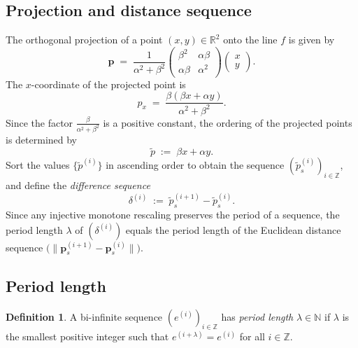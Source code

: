 \documentclass[11pt]{article}
\theoremstyle{plain}
\theoremstyle{definition}
\newtheorem{definition}[theorem]{Definition}
\theoremstyle{remark}
\begin{document}
\subsection{Projection and distance sequence}\label{subsec:projection}

The orthogonal projection of a point $(x, y) \in \mathbb{R}^2$ onto the line
$f$ is given by
\begin{equation}\label{eq:projection}
    \mathbf{p} \;=\;
    \frac{1}{\alpha^2 + \beta^2}
    \begin{pmatrix}
        \beta^2 & \alpha\beta \\
        \alpha\beta & \alpha^2
    \end{pmatrix}
    \begin{pmatrix} x \\ y \end{pmatrix}.
\end{equation}
The $x$-coordinate of the projected point is
\begin{equation}\label{eq:px}
    p_x \;=\; \frac{\beta(\beta x + \alpha y)}{\alpha^2 + \beta^2}.
\end{equation}
Since the factor $\frac{\beta}{\alpha^2+\beta^2}$ is a positive constant,
the ordering of the projected points is determined by
\begin{equation}\label{eq:ptilde}
    \tilde{p} \;:=\; \beta x + \alpha y.
\end{equation}
Sort the values $\{\tilde{p}^{(i)}\}$ in ascending order to obtain the sequence
$(\tilde{p}^{(i)}_s)_{i \in \mathbb{Z}}$,
and define the \emph{difference sequence}
\begin{equation}\label{eq:delta}
    \delta^{(i)} \;:=\; \tilde{p}^{(i+1)}_s - \tilde{p}^{(i)}_s.
\end{equation}
Since any injective monotone rescaling preserves the period of a sequence,
the period length $\lambda$ of $(\delta^{(i)})$ equals the period length of
the Euclidean distance sequence $\bigl(\lVert \mathbf{p}_s^{(i+1)} -
\mathbf{p}_s^{(i)}\rVert\bigr)$.

\subsection{Period length}\label{subsec:period}

\begin{definition}\label{def:period}
A bi-infinite sequence $(e^{(i)})_{i \in \mathbb{Z}}$ has \emph{period length}
$\lambda \in \mathbb{N}$ if $\lambda$ is the smallest positive integer such that
$e^{(i+\lambda)} = e^{(i)}$ for all $i \in \mathbb{Z}$.
\end{definition}
\end{document}
